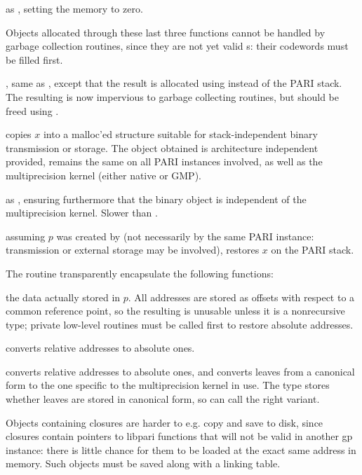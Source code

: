  as
, setting the memory to zero.

\noindent Objects allocated through these last three functions cannot be
handled by garbage collection routines, since they are not yet valid
s: their codewords must be filled first.

, same as , except
that the result is allocated using  instead of the PARI
stack. The resulting  is now impervious to garbage collecting
routines, but should be freed using .


 copies $x$ into a malloc'ed structure suitable
for stack-independent binary transmission or storage. The object obtained
is architecture independent provided,  remains the same
on all PARI instances involved, as well as the multiprecision kernel (either
native or GMP).

 as , ensuring furthermore
that the binary object is independent of the multiprecision kernel. Slower
than .

 assuming $p$ was created by 
(not necessarily by the same PARI instance: transmission or external storage
may be involved), restores $x$ on the PARI stack.

\noindent The routine  transparently encapsulate the following
functions:

 the  data actually stored in $p$.
All addresses are stored as offsets with respect to a common reference point,
so the resulting  is unusable unless it is a nonrecursive type;
private low-level routines must be called first to restore absolute addresses.

 converts relative addresses to
absolute ones.

 converts relative addresses to
absolute ones, and converts leaves from a canonical form to the one
specific to the multiprecision kernel in use. The  type stores
whether leaves are stored in canonical form, so  can call
the right variant.

\noindent Objects containing closures are harder to e.g. copy and save to disk,
since closures contain pointers to libpari functions that will not be valid in
another gp instance: there is little chance for them to be loaded at the exact
same address in memory. Such objects must be saved along with a linking table.


